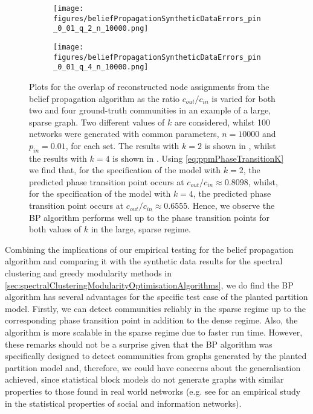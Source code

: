 \begin{figure}
\centering
	\begin{subfigure}{.5\textwidth}
		\centering
		\texttt{[image: figures/beliefPropagationSyntheticDataErrors\_pin\_0\_01\_q\_2\_n\_10000.png]}
		\caption{}
		\label{fig:BPAlgorithmResultsLargeNetwork_k_2}
	\end{subfigure}%
	\begin{subfigure}{.5\textwidth}
		\centering
		\texttt{[image: figures/beliefPropagationSyntheticDataErrors\_pin\_0\_01\_q\_4\_n\_10000.png]}
		\caption{}
		\label{fig:BPAlgorithmResultsLargeNetwork_k_4}
	\end{subfigure}
	\caption[Plot of overlap for belief propagation algorithm on large network for two and four ground-truth communities.]{\label{fig:BPAlgorithmResultsLargeNetwork} Plots for the overlap of reconstructed node assignments from the belief propagation algorithm as the ratio $c_{out}/c_{in}$ is varied for both two and four ground-truth communities in an example of a large, sparse graph. Two different values of $k$ are considered, whilst 100 networks were generated with common parameters, $n = 10000$ and $p_{in} = 0.01$, for each set. The results with $k = 2$ is shown in , whilst the results with $k = 4$ is shown in . Using \cref{eq:ppmPhaseTransitionK} we find that, for the specification of the model with $k=2$, the predicted phase transition point occurs at $c_{out}/c_{in} \approx 0.8098$, whilst, for the specification of the model with $k=4$, the predicted phase transition point occurs at $c_{out}/c_{in} \approx 0.6555$. Hence, we observe the BP algorithm performs well up to the phase transition points for both values of $k$ in the large, sparse regime.}
\end{figure}

Combining the implications of our empirical testing for the belief propagation algorithm and comparing it with the synthetic data results for the spectral clustering and greedy modularity methods in \cref{sec:spectralClusteringModularityOptimisationAlgorithms}, we do find the BP algorithm has several advantages for the specific test case of the planted partition model.
Firstly, we can detect communities reliably in the sparse regime up to the corresponding phase transition point in addition to the dense regime.
Also, the algorithm is more scalable in the sparse regime due to faster run time.
However, these remarks should not be a surprise given that the BP algorithm was specifically designed to detect communities from graphs generated by the planted partition model and, therefore, we could have concerns about the generalisation achieved, since statistical block models do not generate graphs with similar properties to those found in real world networks (e.g. see \cite{LLD+08} for an empirical study in the statistical properties of social and information networks).

